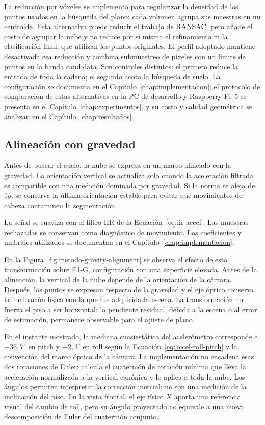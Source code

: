 La reducción por vóxeles se implementó para regularizar la densidad de los puntos usados
en la búsqueda del plano: cada volumen agrupa sus muestras en un centroide. Esta alternativa puede
reducir el trabajo de RANSAC, pero añade el costo de agrupar la nube y no reduce por sí misma el
refinamiento ni la clasificación final, que utilizan los puntos originales. El perfil adoptado
mantiene desactivada esa reducción y combina submuestreo de píxeles con un límite de puntos en la
banda candidata. Son controles distintos: el primero reduce la entrada de toda la cadena; el
segundo acota la búsqueda de suelo. La configuración se documenta en el
Capítulo~\ref{chap:implementacion}; el protocolo de comparación de estas alternativas en la PC de
desarrollo y Raspberry Pi~5 se presenta en el Capítulo~\ref{chap:experimentos}, y su costo y calidad
geométrica se analizan en el Capítulo~\ref{chap:resultados}.

\subsection{Alineación con gravedad}
\label{sec:metodo-v1-gravedad}

Antes de buscar el suelo, la nube se expresa en un marco alineado con la gravedad. La orientación
vertical se actualiza solo cuando la aceleración filtrada es compatible con una medición dominada
por gravedad. Si la norma se aleja de $1g$, se conserva la última orientación estable para evitar
que movimientos de cabeza contaminen la segmentación.

La señal se suaviza con el filtro IIR de la Ecuación~\ref{eq:iir-accel}. Las muestras rechazadas se
conservan como diagnóstico de movimiento. Los coeficientes y umbrales utilizados se documentan
en el Capítulo~\ref{chap:implementacion}.

En la Figura~\ref{fig:metodo-gravity-alignment} se observa el efecto de esta transformación sobre
E1-G, configuración con una superficie elevada. Antes de la alineación, la vertical de la nube depende
de la orientación de la cámara. Después, los puntos se expresan respecto de la gravedad y el eje
óptico conserva la inclinación física con la que fue adquirida la escena. La transformación no
fuerza el piso a ser horizontal: la pendiente residual, debida a la escena o al error de estimación,
permanece observable para el ajuste de plano.

En el instante mostrado, la mediana cuasiestática del acelerómetro corresponde a
$+36{,}7^\circ$ en pitch y $+2{,}3^\circ$ en roll según la Ecuación~\ref{eq:accel-roll-pitch} y la
convención del marco óptico de la cámara. La implementación no encadena esas dos rotaciones de
Euler: calcula el cuaternión de rotación mínima que lleva la aceleración normalizada a la vertical
canónica y lo aplica a toda la nube. Los ángulos permiten interpretar la corrección inercial; no
son una medición de la inclinación del piso. En la vista frontal, el eje físico $X$ aporta una
referencia visual del cambio de roll, pero su ángulo proyectado no equivale a una nueva
descomposición de Euler del cuaternión conjunto.

